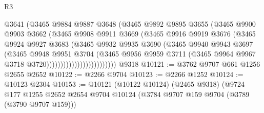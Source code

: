 \begin{lexlean}{R3}
\begin{coremodule}
                                @3641
                                (@3465
                                  @9884
                                  @9887
                                  @3648
                                  (@3465
                                    @9892
                                    @9895
                                    @3655
                                    (@3465
                                      @9900
                                      @9903
                                      @3662
                                      (@3465
                                        @9908
                                        @9911
                                        @3669
                                        (@3465
                                          @9916
                                          @9919
                                          @3676
                                          (@3465
                                            @9924
                                            @9927
                                            @3683
                                            (@3465
                                              @9932
                                              @9935
                                              @3690
                                              (@3465
                                                @9940
                                                @9943
                                                @3697
                                                (@3465
                                                  @9948
                                                  @9951
                                                  @3704
                                                  (@3465
                                                    @9956
                                                    @9959
                                                    @3711
                                                    (@3465
                                                      @9964
                                                      @9967
                                                      @3718
                                                      @3720)))))))))))))))))))))))))
    @9318
@10121 := @3762 @9707 @661 @1256 @2655 @2652
@10122 := @2266 @9704
@10123 := @2266 @1252
@10124 := @10123 @2304
@10153 := @10121
    (@10122 @10124)
    (@2465 @9318)
    (@9724
      @177
      @1255
      @2652
      @2654
      @9704
      @10124
      (@3784 @9707 @159 @9704 (@3789 (@3790 @9707 @159)))

\end{coremodule}
\end{lexlean}
